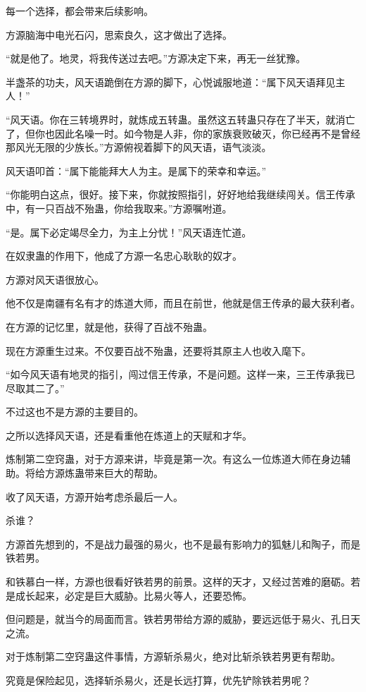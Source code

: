 \begin{this_body}
每一个选择，都会带来后续影响。

方源脑海中电光石闪，思索良久，这才做出了选择。

“就是他了。地灵，将我传送过去吧。”方源决定下来，再无一丝犹豫。

半盏茶的功夫，风天语跪倒在方源的脚下，心悦诚服地道：“属下风天语拜见主人！”

“风天语。你在三转境界时，就炼成五转蛊。虽然这五转蛊只存在了半天，就消亡了，但你也因此名噪一时。如今物是人非，你的家族衰败破灭，你已经再不是曾经那风光无限的少族长。”方源俯视着脚下的风天语，语气淡淡。

风天语叩首：“属下能能拜大人为主。是属下的荣幸和幸运。”

“你能明白这点，很好。接下来，你就按照指引，好好地给我继续闯关。信王传承中，有一只百战不殆蛊，你给我取来。”方源嘱咐道。

“是。属下必定竭尽全力，为主上分忧！”风天语连忙道。

在奴隶蛊的作用下，他成了方源一名忠心耿耿的奴才。

方源对风天语很放心。

他不仅是南疆有名有才的炼道大师，而且在前世，他就是信王传承的最大获利者。

在方源的记忆里，就是他，获得了百战不殆蛊。

现在方源重生过来。不仅要百战不殆蛊，还要将其原主人也收入麾下。

“如今风天语有地灵的指引，闯过信王传承，不是问题。这样一来，三王传承我已尽取其二了。”

不过这也不是方源的主要目的。

之所以选择风天语，还是看重他在炼道上的天赋和才华。

炼制第二空窍蛊，对于方源来讲，毕竟是第一次。有这么一位炼道大师在身边辅助。将给方源炼蛊带来巨大的帮助。

收了风天语，方源开始考虑杀最后一人。

杀谁？

方源首先想到的，不是战力最强的易火，也不是最有影响力的狐魅儿和陶子，而是铁若男。

和铁慕白一样，方源也很看好铁若男的前景。这样的天才，又经过苦难的磨砺。若是成长起来，必定是巨大威胁。比易火等人，还要恐怖。

但问题是，就当今的局面而言。铁若男带给方源的威胁，要远远低于易火、孔日天之流。

对于炼制第二空窍蛊这件事情，方源斩杀易火，绝对比斩杀铁若男更有帮助。

究竟是保险起见，选择斩杀易火，还是长远打算，优先铲除铁若男呢？


\end{this_body}
